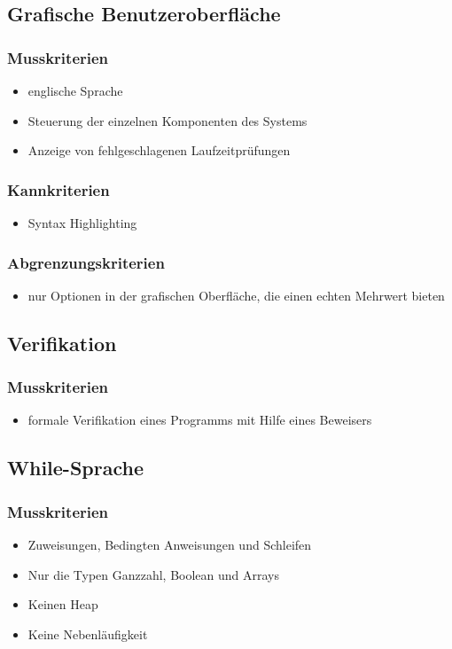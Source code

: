 \documentclass[a4paper,10pt]{article}
\begin{document}
\subsection{Grafische Benutzeroberfläche}
\subsubsection{Musskriterien}
\begin{itemize}
  \item englische Sprache
  \item Steuerung der einzelnen Komponenten des Systems
  \item Anzeige von fehlgeschlagenen Laufzeitprüfungen
\end{itemize}
\subsubsection{Kannkriterien}
\begin{itemize}
  \item Syntax Highlighting
\end{itemize}
\subsubsection{Abgrenzungskriterien}
\begin{itemize}
  \item nur Optionen in der grafischen Oberfläche, die einen echten Mehrwert bieten
\end{itemize}

\subsection{Verifikation}
\subsubsection{Musskriterien}
\begin{itemize}
  \item formale Verifikation eines Programms mit Hilfe eines Beweisers
\end{itemize}

\subsection{While-Sprache}
\subsubsection{Musskriterien}
\begin{itemize}
  \item Zuweisungen, Bedingten Anweisungen und Schleifen
  \item Nur die Typen Ganzzahl, Boolean und Arrays
  \item Keinen Heap
  \item Keine Nebenläufigkeit
\end{itemize}
\end{document}
